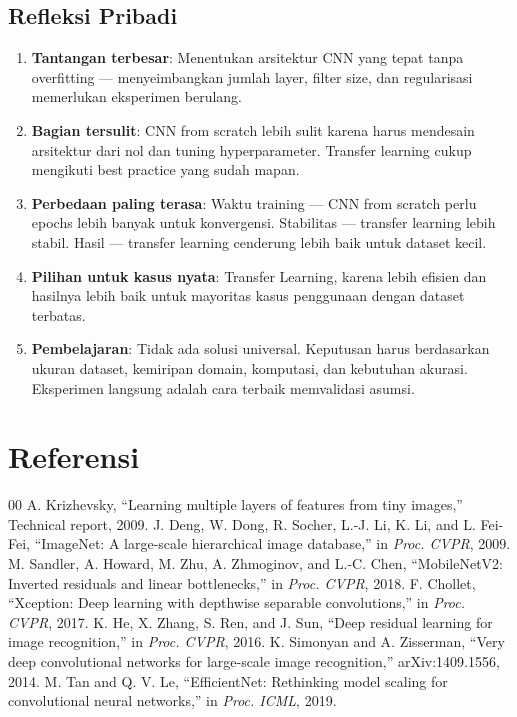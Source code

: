 \documentclass[conference]{IEEEtran}
\begin{document}
\subsection{Refleksi Pribadi}
\begin{enumerate}
\item \textbf{Tantangan terbesar}: Menentukan arsitektur CNN yang tepat tanpa overfitting — menyeimbangkan jumlah layer, filter size, dan regularisasi memerlukan eksperimen berulang.
\item \textbf{Bagian tersulit}: CNN from scratch lebih sulit karena harus mendesain arsitektur dari nol dan tuning hyperparameter. Transfer learning cukup mengikuti best practice yang sudah mapan.
\item \textbf{Perbedaan paling terasa}: Waktu training — CNN from scratch perlu epochs lebih banyak untuk konvergensi. Stabilitas — transfer learning lebih stabil. Hasil — transfer learning cenderung lebih baik untuk dataset kecil.
\item \textbf{Pilihan untuk kasus nyata}: Transfer Learning, karena lebih efisien dan hasilnya lebih baik untuk mayoritas kasus penggunaan dengan dataset terbatas.
\item \textbf{Pembelajaran}: Tidak ada solusi universal. Keputusan harus berdasarkan ukuran dataset, kemiripan domain, komputasi, dan kebutuhan akurasi. Eksperimen langsung adalah cara terbaik memvalidasi asumsi.
\end{enumerate}

\section*{Referensi}
\begin{thebibliography}{00}
 A. Krizhevsky, ``Learning multiple layers of features from tiny images,'' Technical report, 2009.
 J. Deng, W. Dong, R. Socher, L.-J. Li, K. Li, and L. Fei-Fei, ``ImageNet: A large-scale hierarchical image database,'' in \textit{Proc. CVPR}, 2009.
 M. Sandler, A. Howard, M. Zhu, A. Zhmoginov, and L.-C. Chen, ``MobileNetV2: Inverted residuals and linear bottlenecks,'' in \textit{Proc. CVPR}, 2018.
 F. Chollet, ``Xception: Deep learning with depthwise separable convolutions,'' in \textit{Proc. CVPR}, 2017.
 K. He, X. Zhang, S. Ren, and J. Sun, ``Deep residual learning for image recognition,'' in \textit{Proc. CVPR}, 2016.
 K. Simonyan and A. Zisserman, ``Very deep convolutional networks for large-scale image recognition,'' arXiv:1409.1556, 2014.
 M. Tan and Q. V. Le, ``EfficientNet: Rethinking model scaling for convolutional neural networks,'' in \textit{Proc. ICML}, 2019.
\end{thebibliography}
\vspace{12pt}
\end{document}
